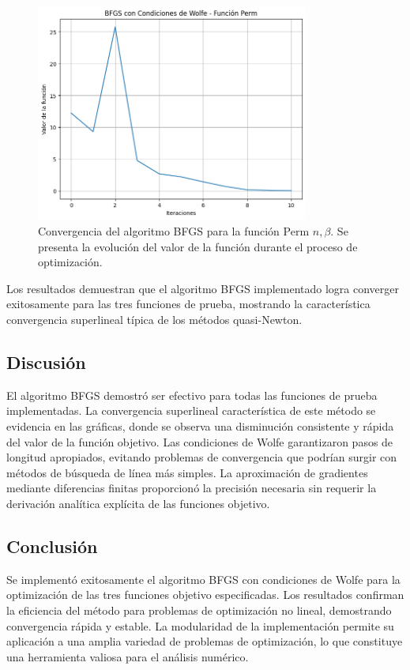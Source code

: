 \documentclass{article}
\begin{document}
\begin{figure}[H]
    \centering
    \includegraphics[width=0.8\textwidth]{images/5_perm.png}
    \caption{Convergencia del algoritmo BFGS para la función Perm $n,\beta$. Se presenta la evolución del valor de la función durante el proceso de optimización.}
\end{figure}

Los resultados demuestran que el algoritmo BFGS implementado logra converger exitosamente para las tres funciones de prueba, mostrando la característica convergencia superlineal típica de los métodos quasi-Newton.

\subsection{Discusión}

El algoritmo BFGS demostró ser efectivo para todas las funciones de prueba implementadas. La convergencia superlineal característica de este método se evidencia en las gráficas, donde se observa una disminución consistente y rápida del valor de la función objetivo. Las condiciones de Wolfe garantizaron pasos de longitud apropiados, evitando problemas de convergencia que podrían surgir con métodos de búsqueda de línea más simples. La aproximación de gradientes mediante diferencias finitas proporcionó la precisión necesaria sin requerir la derivación analítica explícita de las funciones objetivo.

\subsection{Conclusión}

Se implementó exitosamente el algoritmo BFGS con condiciones de Wolfe para la optimización de las tres funciones objetivo especificadas. Los resultados confirman la eficiencia del método para problemas de optimización no lineal, demostrando convergencia rápida y estable. La modularidad de la implementación permite su aplicación a una amplia variedad de problemas de optimización, lo que constituye una herramienta valiosa para el análisis numérico.
\end{document}
